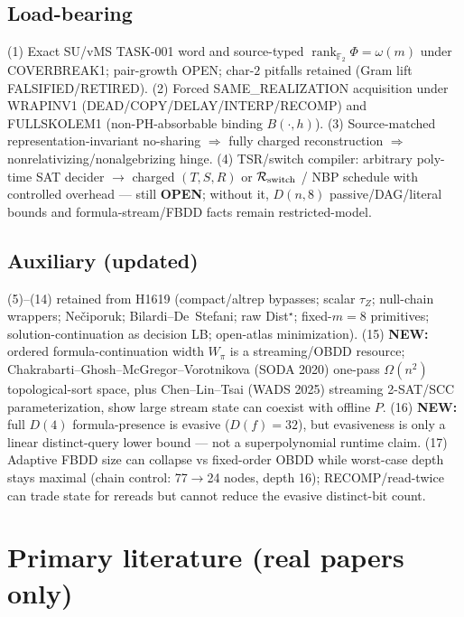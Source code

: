 \documentclass[11pt]{article}
\begin{document}
\subsection*{Load-bearing}
(1) Exact SU/vMS TASK-001 word and source-typed
$\operatorname{rank}_{\mathbb F_2}\Phi=\omega(m)$ under COVERBREAK1; pair-growth OPEN;
char-$2$ pitfalls retained (Gram lift FALSIFIED/RETIRED).
(2) Forced SAME\_REALIZATION acquisition under WRAPINV1
(DEAD/COPY/DELAY/INTERP/RECOMP) and FULLSKOLEM1 (non-PH-absorbable binding $B(\cdot,h)$).
(3) Source-matched representation-invariant no-sharing $\Rightarrow$ fully charged reconstruction
$\Rightarrow$ nonrelativizing/nonalgebrizing hinge.
(4) TSR/switch compiler: arbitrary poly-time SAT decider $\to$ charged $(T,S,R)$ or
$\mathcal R_{\rm switch}$ / NBP schedule with controlled overhead --- still \textbf{OPEN};
without it, $D(n,8)$ passive/DAG/literal bounds and formula-stream/FBDD facts remain
restricted-model.

\subsection*{Auxiliary (updated)}
(5)--(14) retained from H1619 (compact/altrep bypasses; scalar $\tau_Z$; null-chain wrappers;
Ne\v{c}iporuk; Bilardi--De~Stefani; raw Dist$^\star$; fixed-$m=8$ primitives; solution-continuation
as decision LB; open-atlas minimization).
(15) \textbf{NEW:} ordered formula-continuation width $W_\pi$ is a streaming/OBDD resource;
Chakrabarti--Ghosh--McGregor--Vorotnikova (SODA 2020) one-pass $\Omega(n^2)$ topological-sort
space, plus Chen--Lin--Tsai (WADS 2025) streaming 2-SAT/SCC parameterization, show large
stream state can coexist with offline $P$.
(16) \textbf{NEW:} full $D(4)$ formula-presence is evasive ($D(f)=32$), but evasiveness is only
a linear distinct-query lower bound --- not a superpolynomial runtime claim.
(17) Adaptive FBDD size can collapse vs fixed-order OBDD while worst-case depth stays maximal
(chain control: 77$\to$24 nodes, depth 16); RECOMP/read-twice can trade state for rereads but
cannot reduce the evasive distinct-bit count.

\section*{Primary literature (real papers only)}
\end{document}
